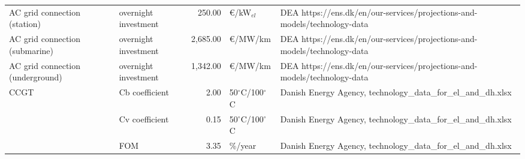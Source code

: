 \begin{longtable}{p{4cm}p{4cm}rp{3cm}p{10cm}}
\bottomrule
\endlastfoot
AC grid connection (station) & overnight investment &       250.00 &               \euro/kW$_{el}$ &                                                                                                                                                                                                                                                            DEA https://ens.dk/en/our-services/projections-and-models/technology-data \\
AC grid connection (submarine) & overnight investment &     2,685.00 &                   \euro/MW/km &                                                                                                                                                                                                                                                            DEA https://ens.dk/en/our-services/projections-and-models/technology-data \\
AC grid connection (underground) & overnight investment &     1,342.00 &                   \euro/MW/km &                                                                                                                                                                                                                                                            DEA https://ens.dk/en/our-services/projections-and-models/technology-data \\
CCGT & Cb coefficient &         2.00 &  50$^{\circ}$C/100$^{\circ}$C &                                                                                                                                                                                                                                                                        Danish Energy Agency, technology\_data\_for\_el\_and\_dh.xlsx \\
                      & Cv coefficient &         0.15 &  50$^{\circ}$C/100$^{\circ}$C &                                                                                                                                                                                                                                                                        Danish Energy Agency, technology\_data\_for\_el\_and\_dh.xlsx \\
                      & FOM &         3.35 &                       \%/year &                                                                                                                                                                                                                                                                        Danish Energy Agency, technology\_data\_for\_el\_and\_dh.xlsx \\

\end{longtable}
